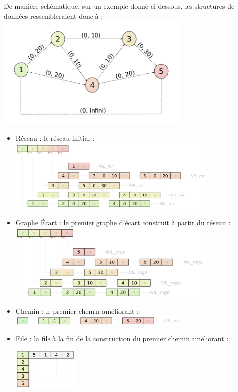 \documentclass[11pt, a4paper]{report}
\begin{document}
	\pagebreak
	De manière schématique, sur un exemple donné ci-dessous, les structures de données ressembleraient donc à :\\
	\includegraphics[width=0.7\textwidth]{images/R3.png}\\
	\begin{itemize}
        \item Réseau : le réseau initial :\\
		\includegraphics[width=0.8\textwidth]{images/sch_reseau.png}\\

        \item Graphe Écart : le premier graphe d'écart construit à partir du réseau :\\
		\includegraphics[width=0.8\textwidth]{images/sch_graphe_ecart.png}\\

        \item Chemin : le premier chemin améliorant :\\
		\includegraphics[width=0.7\textwidth]{images/sch_chemin.png}\\

		\pagebreak
        \item File : la file à la fin de la construction du premier chemin améliorant :\\
		\includegraphics[width=0.25\textwidth]{images/sch_file.png}\\
	\end{itemize}
	
\end{document}
